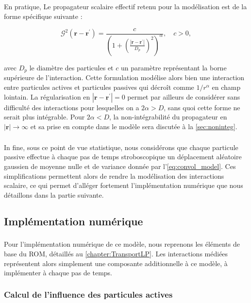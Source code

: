 \subparagraph{}En pratique, Le propagateur scalaire effectif retenu pour la modélisation est de la forme spécifique suivante :

\begin{equation}
	\mathcal{G}^2(\mathbf{r}-\mathbf{r}^\prime) = \frac{c}{\left(1+\left(\frac{|\mathbf{r}-\mathbf{r}^\prime|}{D_p}\right)^2\right)^\alpha}, \quad c > 0,
\end{equation}

\noindent avec $D_p$ le diamètre des particules et $c$ un paramètre représentant la borne supérieure de l'interaction. Cette formulation modélise alors bien une interaction entre particules actives et particules passives qui décroît comme $1/r^\alpha$ en champ lointain. La régularisation en $|\mathbf{r}-\mathbf{r}^\prime|=0$ permet par ailleurs de considérer sans difficulté des interactions pour lesquelles on a $2\alpha > D$, sans quoi cette forme ne serait plus intégrable. Pour $2\alpha < D$, la non-intégrabilité du propagateur en $|\mathbf{r}|\rightarrow\infty$ et sa prise en compte dans le modèle sera discutée à la \autoref{sec:noninteg}.

\subparagraph{}In fine, sous ce point de vue statistique, nous considérons que chaque particule passive effectue à chaque pas de temps stroboscopique un déplacement aléatoire gaussien de moyenne nulle et de variance donnée par l'\autoref{eq:convol_model}. Ces simplifications permettent alors de rendre la modélisation des interactions scalaire, ce qui permet d'alléger fortement l'implémentation numérique que nous détaillons dans la partie suivante.

\subsection{Implémentation numérique}

\label{sec:ImplNumTBLRR}

\subparagraph{}Pour l'implémentation numérique de ce modèle, nous reprenons les éléments de base du ROM, détaillés au \autoref{chapter:TransportLP}. Les interactions médiées représentent alors simplement une composante additionnelle à ce modèle, à implémenter à chaque pas de temps. 

\subsubsection{Calcul de l'influence des particules actives}

